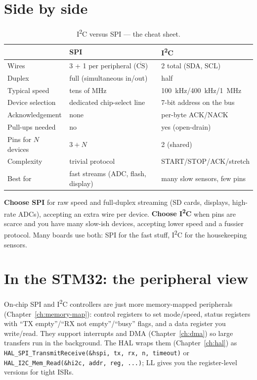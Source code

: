 \documentclass[11pt,a4paper,oneside]{book}
\newcommand{\code}[1]{\texttt{#1}}
\begin{document}
\section{Side by side}
\begin{table}[h]
\centering
\caption{I\textsuperscript{2}C versus SPI --- the cheat sheet.}
\label{tab:i2c-spi}
\small
\begin{tabular}{@{}lll@{}}
\toprule
 & \textbf{SPI} & \textbf{I\textsuperscript{2}C}\\
\midrule
Wires            & 3 + 1 per peripheral ($\overline{\text{CS}}$) & 2 total (SDA, SCL)\\
Duplex           & full (simultaneous in/out) & half\\
Typical speed    & tens of \si{\mega\hertz} & \qty{100}{\kilo\hertz}/\qty{400}{\kilo\hertz}/\qty{1}{\mega\hertz}\\
Device selection & dedicated chip-select line & 7-bit address on the bus\\
Acknowledgement  & none & per-byte ACK/NACK\\
Pull-ups needed  & no & yes (open-drain)\\
Pins for $N$ devices & $3+N$ & 2 (shared)\\
Complexity       & trivial protocol & START/STOP/ACK/stretch\\
Best for         & fast streams (ADC, flash, display) & many slow sensors, few pins\\
\bottomrule
\end{tabular}
\end{table}

\begin{keyidea}
\textbf{Choose SPI} for raw speed and full-duplex streaming (SD cards, displays,
high-rate ADCs), accepting an extra wire per device. \textbf{Choose
I\textsuperscript{2}C} when pins are scarce and you have many slow-ish devices,
accepting lower speed and a fussier protocol. Many boards use both: SPI for the
fast stuff, I\textsuperscript{2}C for the housekeeping sensors.
\end{keyidea}

\section{In the STM32: the peripheral view}
On-chip SPI and I\textsuperscript{2}C controllers are just more memory-mapped
peripherals (Chapter~\ref{ch:memory-map}): control registers to set mode/speed,
status registers with ``TX empty''/``RX not empty''/``busy'' flags, and a data
register you write/read. They support interrupts and DMA (Chapter~\ref{ch:dma})
so large transfers run in the background. The HAL wraps them
(Chapter~\ref{ch:hal}) as \code{HAL\_SPI\_TransmitReceive(\&hspi, tx, rx, n,
timeout)} or \code{HAL\_I2C\_Mem\_Read(\&hi2c, addr, reg, ...)}; LL gives you the
register-level versions for tight ISRs.
\end{document}
